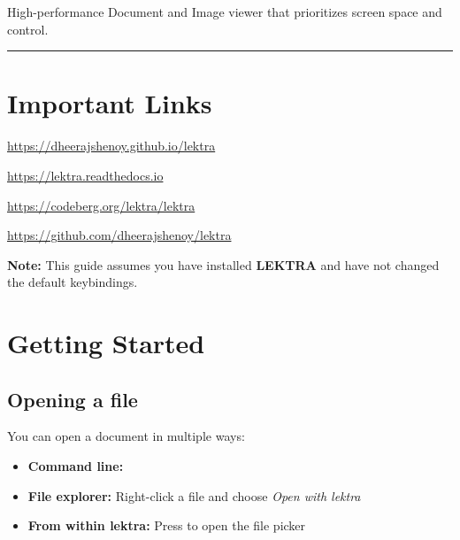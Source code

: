 \documentclass[a4paper,12pt]{article}
\begin{document}

High-performance Document and Image viewer that prioritizes screen space and control.

\vspace{1em}
\hrule
\vspace{1em}

\section*{Important Links}

\begin{description}[
    style=nextline,
    font=\bfseries,
    leftmargin=1.2em,
    labelindent=0pt,
    itemsep=0.2em,
    parsep=0pt
]
    \item[Homepage] \url{https://dheerajshenoy.github.io/lektra}
    \item[Documentation] \url{https://lektra.readthedocs.io}
    \item[Source (Codeberg)] \url{https://codeberg.org/lektra/lektra}
    \item[Source (GitHub mirror)] \url{https://github.com/dheerajshenoy/lektra}
\end{description}

\begin{ghnote}
    \textbf{Note:} This guide assumes you have installed \textbf{LEKTRA} and have not changed the default keybindings.
\end{ghnote}

\tableofcontents
\newpage

\section{Getting Started}

\subsection{Opening a file}
You can open a document in multiple ways:

\begin{itemize}[leftmargin=*]
    \item \textbf{Command line:} 
    \item \textbf{File explorer:} Right-click a file and choose \textit{Open with lektra}
    \item \textbf{From within lektra:} Press  to open the file picker
\end{itemize}
\end{document}
